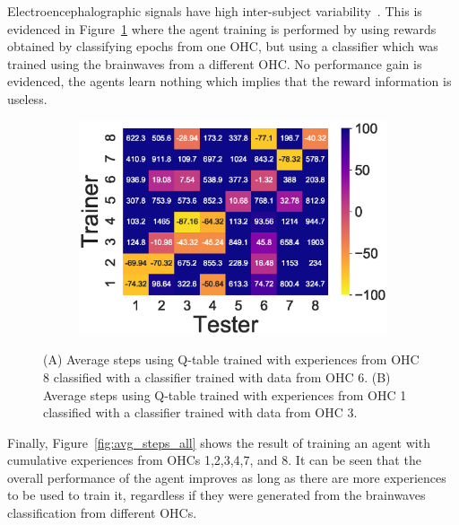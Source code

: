 \documentclass[journal]{IEEEtran}
\begin{document}
{{Electroencephalographic signals have high inter-subject variability~\cite{Chavarriaga2014}.   This is evidenced in Figure~\ref{fig:transferlearning} where the agent training is performed by using rewards obtained by classifying epochs from one OHC, but using a classifier which was trained using the brainwaves from a different OHC.   No performance gain is evidenced, the agents learn nothing which implies that the reward information is useless.


\begin{figure}[h!]
\begin{subfigure}{0.5\textwidth}
\includegraphics[scale=0.60]{revisedimages/transfer_learning_heatmap.eps}
\end{subfigure}
\caption{(A) Average steps using Q-table trained with experiences from OHC 8 classified with a classifier trained with data from OHC 6.  (B) Average steps using Q-table trained with experiences from OHC 1 classified with a classifier trained with data from OHC 3.}
\label{fig:transferlearning}
\end{figure}

Finally, Figure~\ref{fig:avg_steps_all} shows the result of training an agent with cumulative experiences from OHCs 1,2,3,4,7, and 8.  It can be seen that the overall performance of the agent improves as long as there are more experiences to be used to train it, regardless if they were generated from the brainwaves classification from different OHCs.  


}}
\end{document}
